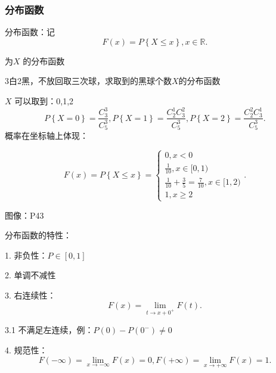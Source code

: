 \subsubsection*{分布函数}%
\label{subsub:分布函数}
\begin{defi}
    分布函数：记\[
        F\left( x \right) =P\left\{ X\le x \right\} ,x\in \mathbb{R}
    .\]

    为$X$ 的分布函数
\end{defi}
\begin{eg}
    3白2黑，不放回取三次球，求取到的黑球个数$X$的分布函数

    $X$ 可以取到：0,1,2
    \[
        P\left\{ X=0 \right\} =\frac{C_{3}^{3}}{C_{5}^{3}},P\left\{ X=1 \right\} =\frac{C_{2}^{1}C_{3}^{2}}{C_{5}^{3}},P\left\{ X=2 \right\} =\frac{C_{2}^{2}C_{3}^{1}}{C_{5}^{3}}
    .\] 
    概率在坐标轴上体现：
    \begin{center}
    \end{center}
    \[
        F\left( x \right) =P\left\{ X\le x \right\} =
        \begin{cases}
            0,x<0\\
            \frac{1}{10},x\in [0,1)\\
            \frac{1}{10}+\frac{3}{5}=\frac{7}{10},x\in [1,2)\\
            1,x\ge 2
        \end{cases}
    .\] 

    图像：P43

\end{eg}
\begin{notation}
    分布函数的特性：

    1. 非负性：$P\in \left[ 0,1 \right] $

    2. 单调不减性

    3. 右连续性：\[
        F\left( x \right) =\lim_{t \to x+0^+} F\left( t \right) 
    .\] 

    3.1 不满足左连续，例：$P\left( 0 \right) -P\left( 0^- \right) \neq 0$

    4. 规范性：\[
        F\left( -\infty \right) =\lim_{x \to -\infty} F\left( x \right) =0,F\left( +\infty \right) =\lim_{x \to +\infty} F\left( x \right) =1
    .\] 
\end{notation}
